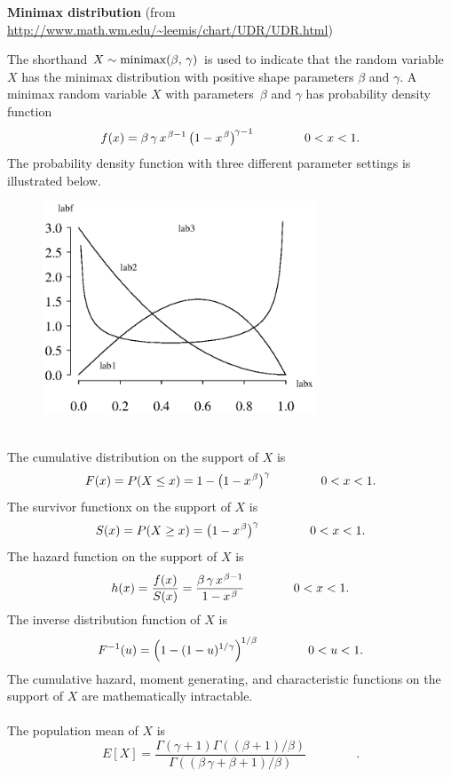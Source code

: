 \documentclass[12pt,fullpage]{article}
\begin{document}
\noindent
{\bf Minimax distribution} (from \color{blue}\url{http://www.math.wm.edu/~leemis/chart/UDR/UDR.html}\color{black})

\noindent
The shorthand $X \sim {\rm minimax}(\beta,\, \gamma)$ is used to indicate that the
random variable $X$ has the minimax distribution with positive shape parameters $\beta$ and $\gamma$.
A minimax random variable $X$ with parameters~$\beta$ and $\gamma$ has probability density function 
$$
f(x) = {\it \beta} \,\gamma \, {x} ^ {{\kern 0.08 em \beta} - 1} \left( 1 - {x} ^ {{\kern 0.08 em \beta}}
 \right) ^ {\kern -0.08 em \gamma - 1} \qquad \qquad 0< x < 1.
$$
The probability density function with three different parameter settings is illustrated below.
{\begin{figure}[h!]
\begin{center}
\includegraphics[width=3.2in]{MinimaxPlot.ps}
\end{center}
\end{figure}}\\
The cumulative distribution on the support of $X$ is
$$
F(x) = P(X \leq x) = 1 - \left(1 - x ^ {\kern 0.08 em \beta} \right) ^ \gamma \qquad \qquad 0 < x < 1.
$$
The survivor functionx on the support of $X$ is
$$
S(x) = P(X \geq x) = \left(1 - x ^ {\kern 0.08 em \beta} \right) ^ \gamma \qquad \qquad 0 < x < 1.
$$
The hazard function on the support of $X$ is
$$
h(x) = \frac{f(x)}{S(x)} = {\frac {{\beta} \, \gamma \, {x} ^ {{\kern 0.08 em \beta} - 1}}{1 - {x} ^ {{\kern 0.08 em
 \beta}}}} \qquad \qquad 0 < x < 1.
$$
The inverse distribution function of $X$ is
$$
F ^ {-1}(u) = \left(1 - (1 - u) ^ {1 / \gamma} \right) ^ {\kern -0.08 em 1 / \beta} \qquad \qquad 0 < u < 1.
$$
The cumulative hazard, moment generating, and characteristic functions on 
the support of $X$ are mathematically intractable.\\
\\
\noindent
The population mean of $X$ is
$$
E[X] = \frac{\Gamma  \left( \gamma + 1 \right) \Gamma  \left( {({\beta} + 1)/{\beta}} \right)} {\Gamma  \left( ({\beta} \, \gamma + {\beta
} + 1)/{\beta} \right)} \qquad \qquad. 
$$
\end{document}
